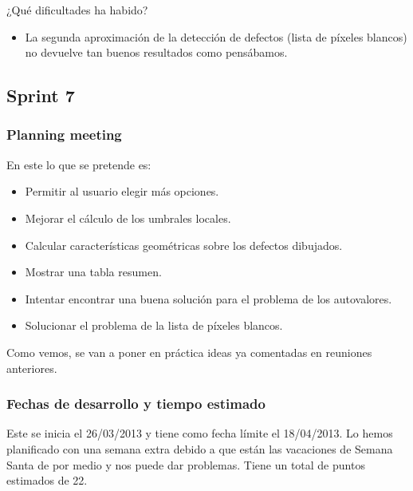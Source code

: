 ¿Qué dificultades ha habido?
\begin{itemize}
 \item La segunda aproximación de la detección de defectos (lista de píxeles blancos) no devuelve tan buenos resultados como pensábamos.
\end{itemize}


\subsection{Sprint 7}
\subsubsection*{Planning meeting}
En este \sprint{} lo que se pretende es:

\begin{itemize}
\item Permitir al usuario elegir más opciones.
\item Mejorar el cálculo de los umbrales locales.
\item Calcular características geométricas sobre los defectos dibujados.
\item Mostrar una tabla resumen.
\item Intentar encontrar una buena solución para el problema de los autovalores.
\item Solucionar el problema de la lista de píxeles blancos.
\end{itemize}

Como vemos, se van a poner en práctica ideas ya comentadas en reuniones anteriores.

\subsubsection*{Fechas de desarrollo y tiempo estimado}
Este \sprint{} se inicia el 26/03/2013 y tiene como fecha límite el 18/04/2013. Lo hemos planificado con una semana extra debido a que están las vacaciones de Semana Santa de por medio y nos puede dar problemas. Tiene un total de puntos estimados de 22.


